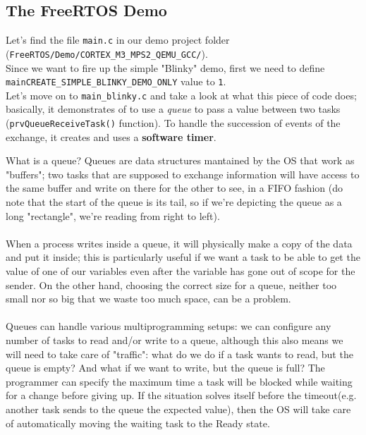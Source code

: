 \documentclass[10pt]{article}
\begin{document}
\clearpage
\newpage

\subsection{The FreeRTOS Demo}
Let's find the file \verb|main.c| in our demo project folder (\verb|FreeRTOS/Demo/CORTEX_M3_MPS2_QEMU_GCC/|). \\Since we want to fire up the simple "Blinky" demo, first we need to define  \verb|mainCREATE_SIMPLE_BLINKY_DEMO_ONLY| value to \verb|1|.\\ Let's move on to \verb|main_blinky.c| and take a look at what this piece of code does; basically, it demonstrates of to use a \textit{queue} to pass a value between two tasks (\verb|prvQueueReceiveTask()| function). To handle the succession of events of the exchange, it creates and uses a \textbf{software timer}. \\

\begin{example}{What is a queue?}
Queues are data structures mantained by the OS that work as "buffers"; two tasks that are supposed to exchange information will have access to the same buffer and write on there for the other to see, in a FIFO fashion (do note that the start of the queue is its tail, so if we're depicting the queue as a long "rectangle", we're reading from right to left).\\
\\
When a process writes inside a queue, it will physically make a copy of the data and put it inside; this is particularly useful if we want a task to be able to get the value of one of our variables even after the variable has gone out of scope for the sender. On the other hand, choosing the correct size for a queue, neither too small nor so big that we waste too much space, can be a problem.
\\
\\
Queues can handle various multiprogramming setups: we can configure any number of tasks to read and/or write to a queue, although this also means we will need to take care of "traffic": what do we do if a task wants to read, but the queue is empty? And what if we want to write, but the queue is full? The programmer can specify the maximum time a task will be blocked while waiting for a change before giving up. If the situation solves itself before the timeout(e.g. another task sends to the queue the expected value), then the OS will take care of automatically moving the waiting task to the Ready state.
\end{example}
\end{document}
